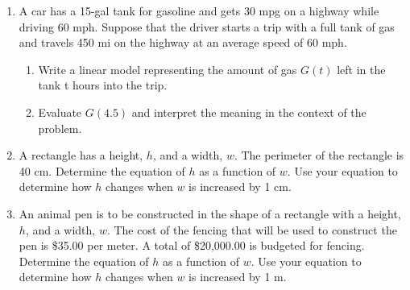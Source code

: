 \begin{enumerate}
 \item A car has a 15-gal tank for gasoline and gets 30 mpg on a highway while driving 60 mph. Suppose that the driver starts a trip with a full tank of gas and travels 450 mi on the highway at an average speed of 60 mph.
 
 \begin{enumerate}
 \item Write a linear model representing the amount of gas $G(t)$ left in the tank t hours into the trip.
 \vfill
 \vfill
 \item Evaluate $G(4.5)$ and interpret the meaning in the context of the problem.
 \vfill
 \end{enumerate}

\clearpage

\item A rectangle has a height, $h$, and a width, $w$. The perimeter
  of the rectangle is 40 cm. Determine the equation of $h$ as a
  function of $w$. Use your equation to determine how $h$ changes when
  $w$ is increased by 1 cm.

  \vfill

\item An animal pen is to be constructed in the shape of a rectangle
  with a height, $h$, and a width, $w$. The cost of the fencing that
  will be used to construct the pen is \$35.00 per meter. A total of
  \$20,000.00 is budgeted for fencing. Determine the equation of $h$
  as a function of $w$. Use your equation to determine how $h$ changes
  when $w$ is increased by 1 m.

  \vfill

 
 \clearpage
 

\end{enumerate}
